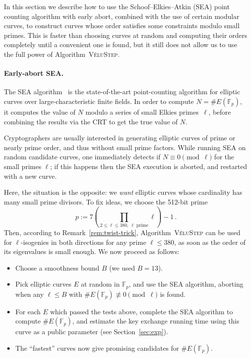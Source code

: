\documentclass{llncs}
\newcommand{\F}{\mathbb{F}}
\newcommand{\algstyle}[1]{\textsc{#1}}
\begin{document}
In this section we describe how to use the Schoof--Elkies--Atkin (SEA) point counting
algorithm with early abort, combined with the use of certain modular curves,
to construct curves whose order satisfies some constraints
modulo small primes.
This is faster than choosing curves at random and computing their orders
completely until a convenient one is found, but it still does not allow us
to use the full power of Algorithm~\algstyle{VéluStep}.

\paragraph{Early-abort SEA.}
The SEA algorithm~\cite{schoof95,Morain95}
is the state-of-the-art point-counting algorithm
for elliptic curves over large-characteristic finite fields.
In order to compute $N = \# E(\F_p)$, it computes the value of $N$ modulo a series
of small Elkies primes~$\ell$, before combining the results via the CRT
to get the true value of $N$.

Cryptographers are usually interested in generating elliptic curves of
prime or nearly prime order, and thus without small prime factors.
While running SEA on random candidate curves,
one immediately detects if $N \equiv 0\pmod{\ell}$
for the small primes $\ell$;
if this happens then the SEA execution is aborted, and restarted with a new curve.

Here, the situation is the opposite: we \emph{want} elliptic curves
whose cardinality has many small prime divisors.
To fix ideas, we choose the 512-bit prime
\[
    p 
    := 
    7 \left(
        \prod_{2\leq\ell\leq 380,\ \ell \text{ prime}} \ell
    \right) - 1
    \,.
\]
Then, according to Remark~\ref{rem:twist-trick},
Algorithm~\algstyle{VéluStep} can be used for $\ell$-isogenies in both
directions for any prime $\ell\leq 380$, as soon as the order of its
eigenvalues is small enough.
We now proceed as follows:
\begin{itemize}
    \item 
        Choose a smoothness bound $B$ (we used $B = 13$).
    \item 
        Pick elliptic curves $E$ at random in $\F_p$, and use the SEA algorithm,
        aborting when any $\ell\leq B$ 
        with $\#E(\F_p) \not\equiv 0\pmod{\ell}$ is found.
    \item 
        For each $E$ which passed the tests above, 
        complete the SEA algorithm to compute $\#E(\F_p)$, 
        and estimate the key exchange running time 
        using this curve as a public parameter (see Section~\ref{sec:exp}).
    \item
        The ``fastest'' curves now give promising candidates for $\#E(\F_p)$.
\end{itemize}
\end{document}
